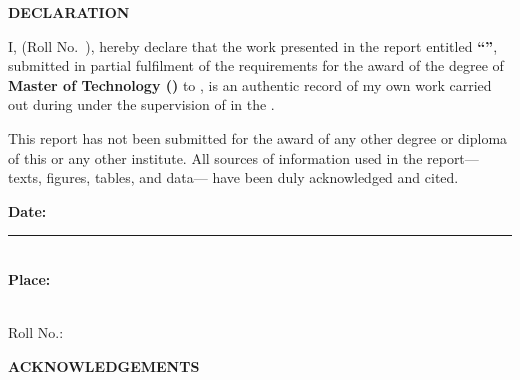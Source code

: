 %   


\cleardoublepage
{}
\thispagestyle{empty}

\begin{center}
  {\Large \textbf{DECLARATION}}
\end{center}
\vspace{0.8cm}

I, \textbf{\AuthorName} (Roll No.\ \textbf{\RollNo}), hereby declare that the work presented
in the report entitled \textbf{``\ThesisTitle''}, submitted in partial fulfilment of the
requirements for the award of the degree of \textbf{Master of Technology (\Programme)} to
\textbf{\InstituteName}, is an authentic record of my own work carried out during
\textbf{\SessionDates} under the supervision of \textbf{\Supervisor} in the \textbf{\Department}.

\vspace{0.6cm}
This report has not been submitted for the award of any other degree or diploma of this or any
other institute. All sources of information used in the report—texts, figures, tables, and data—
have been duly acknowledged and cited.

\vspace{1.2cm}
\noindent
\begin{minipage}[t]{0.48\textwidth}
  \textbf{Date:} \rule{5cm}{0.4pt}\\[0.6cm]
  \textbf{Place:} \InstituteCity
\end{minipage}\hfill
\begin{minipage}[t]{0.48\textwidth}
  \raggedleft
  \textbf{\AuthorName}\\
  Roll No.: \textbf{\RollNo}
\end{minipage}

\cleardoublepage
{}
\thispagestyle{empty}

\begin{center}
  {\Large \textbf{ACKNOWLEDGEMENTS}}
\end{center}
\vspace{0.9cm}

